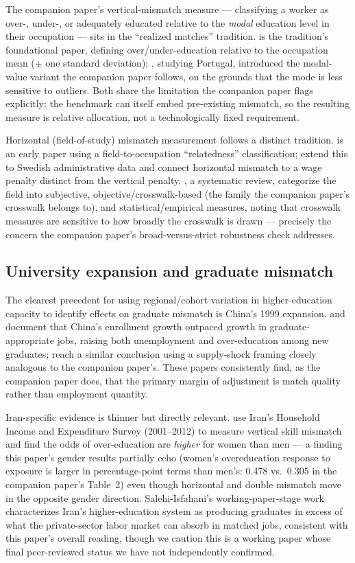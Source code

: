 \documentclass[11pt]{article}
\begin{document}
The companion paper's vertical-mismatch measure --- classifying a worker as over-, under-, or adequately educated relative to the \emph{modal} education level in their occupation --- sits in the ``realized matches'' tradition. \citet{verdugo1989} is the tradition's foundational paper, defining over/under-education relative to the occupation mean ($\pm$ one standard deviation); \citet{kiker1997}, studying Portugal, introduced the modal-value variant the companion paper follows, on the grounds that the mode is less sensitive to outliers. Both share the limitation the companion paper flags explicitly: the benchmark can itself embed pre-existing mismatch, so the resulting measure is relative allocation, not a technologically fixed requirement.

Horizontal (field-of-study) mismatch measurement follows a distinct tradition. \citet{robst2007} is an early paper using a field-to-occupation ``relatedness'' classification; \citet{nordin2010} extend this to Swedish administrative data and connect horizontal mismatch to a wage penalty distinct from the vertical penalty. \citet{somers2019}, a systematic review, categorize the field into subjective, objective/crosswalk-based (the family the companion paper's crosswalk belongs to), and statistical/empirical measures, noting that crosswalk measures are sensitive to how broadly the crosswalk is drawn --- precisely the concern the companion paper's broad-versus-strict robustness check addresses.

\subsection{University expansion and graduate mismatch}

The clearest precedent for using regional/cohort variation in higher-education capacity to identify effects on graduate mismatch is China's 1999 expansion. \citet{li2014} and \citet{li2008} document that China's enrollment growth outpaced growth in graduate-appropriate jobs, raising both unemployment and over-education among new graduates; \citet{knight2017} reach a similar conclusion using a supply-shock framing closely analogous to the companion paper's. These papers consistently find, as the companion paper does, that the primary margin of adjustment is match quality rather than employment quantity.

Iran-specific evidence is thinner but directly relevant. \citet{haddad2017} use Iran's Household Income and Expenditure Survey (2001--2012) to measure vertical skill mismatch and find the odds of over-education are \emph{higher} for women than men --- a finding this paper's gender results partially echo (women's overeducation response to exposure is larger in percentage-point terms than men's: 0.478 vs.\ 0.305 in the companion paper's Table~2) even though horizontal and double mismatch move in the opposite gender direction. Salehi-Isfahani's working-paper-stage work characterizes Iran's higher-education system as producing graduates in excess of what the private-sector labor market can absorb in matched jobs, consistent with this paper's overall reading, though we caution this is a working paper whose final peer-reviewed status we have not independently confirmed.
\end{document}
